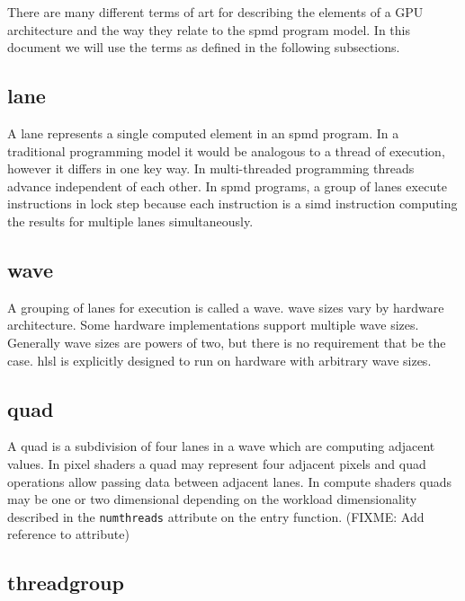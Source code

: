 \p There are many different terms of art for describing the elements of a GPU
architecture and the way they relate to the \acrshort{spmd} program model. In
this document we will use the terms as defined in the following subsections.

\subsection{\gls{lane}} \label{subsection:Lane}

\p A \gls{lane} represents a single computed element in an \acrshort{spmd}
program. In a traditional programming model it would be analogous to a thread of
execution, however it differs in one key way. In multi-threaded programming
threads advance independent of each other. In \acrshort{spmd} programs, a group
of \gls{lane}s execute instructions in lock step because each instruction is a
\acrshort{simd} instruction computing the results for multiple \gls{lane}s
simultaneously.

\subsection{\gls{wave}} \label{subsection:Wave}

\p A grouping of \gls{lane}s for execution is called a \gls{wave}. \gls{wave}
sizes vary by hardware architecture. Some hardware implementations support
multiple wave sizes. Generally wave sizes are powers of two, but there is no
requirement that be the case. \acrshort{hlsl} is explicitly designed to run on
hardware with arbitrary \gls{wave} sizes.

\subsection{\gls{quad}} \label{subsection:Quad}

\p A \gls{quad} is a subdivision of four \gls{lane}s in a \gls{wave} which are
computing adjacent values. In pixel shaders a \gls{quad} may represent four
adjacent pixels and \gls{quad} operations allow passing data between adjacent
lanes. In compute shaders quads may be one or two dimensional depending on the
workload dimensionality described in the \texttt{numthreads} attribute on the
entry function. (FIXME: Add reference to attribute)

\subsection{\gls{threadgroup}} \label{subsection:Group}

